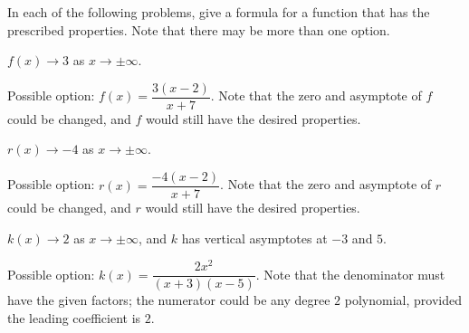 \begin{exercises}
	 \begin{problem}
	 In each of the following problems, give a formula for a function that
	 has the prescribed properties. Note that there may be more than one option.
	 \begin{subproblem}
		 $f(x)\rightarrow 3$ as $x\rightarrow\pm\infty$.
		 \begin{shortsolution}
			 Possible option: $f(x)=\dfrac{3(x-2)}{x+7}$. Note that
			 the zero and asymptote of $f$ could be changed, and $f$ would still have the desired properties.
		 \end{shortsolution}
	 \end{subproblem}
	 \begin{subproblem}
		 $r(x)\rightarrow -4$ as $x\rightarrow\pm\infty$.
		 \begin{shortsolution}
			 Possible option: $r(x)=\dfrac{-4(x-2)}{x+7}$. Note that
			 the zero and asymptote of $r$ could be changed, and $r$ would still have the desired properties.
		 \end{shortsolution}
	 \end{subproblem}
	 \begin{subproblem}
		 $k(x)\rightarrow 2$ as $x\rightarrow\pm\infty$, and $k$ has vertical asymptotes at $-3$ and $5$.
		 \begin{shortsolution}
			 Possible option: $k(x)=\dfrac{2x^2}{(x+3)(x-5)}$. Note that the denominator
			 must have the given factors; the numerator could be any degree $2$ polynomial, provided the
			 leading coefficient is $2$.
		 \end{shortsolution}
	 \end{subproblem}
	 \end{problem}


\end{exercises}
